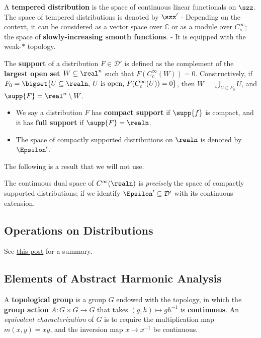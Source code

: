 A \textbf{tempered distribution} is the space of continuous linear
functionals on \(\szz\). The space of tempered distributions is denoted
by \(\szz'\) - Depending on the context, it can be considered as a
vector space over \(\mathbb{C}\) or as a module over \(C_{s}^\infty\);
the space of \textbf{slowly-increasing smooth functions}. - It is
equipped with the weak-\(\ast\) topology.

The \textbf{support} of a distribution \(F\in \mathcal{D}'\) is defined
as the complement of the \textbf{largest open set \(W\subseteq\real^n\)}
such that \(F(C_c^\infty(W))=0\). Constructively, if
\(F_0 = \bigset{U\subseteq\realn,\: U\text{ is open, } F(C_c^\infty(U))=0}\),
then \(W = \bigcup_{U\in F_0}U\), and
\(\supp{F} = \real^{n}\setminus W\).

\begin{itemize}
\tightlist
\item
  We say a distribution \(F\) has \textbf{compact support} if
  \(\supp{f}\) is compact, and it has \textbf{full support} if
  \(\supp{F} = \realn\).
\item
  The space of compactly supported distributions on \(\realn\) is
  denoted by \(\Epsilon'\).
\end{itemize}

The following is a result that we will not use.

The continuous dual space of \(C^\infty(\realn)\) is \emph{precisely}
the space of compactly supported distributions; if we identify
\(\Epsilon'\subseteq\mathcal{D}'\) with its continuous extension.

\hypertarget{operations-on-distributions}{%
\subsection{Operations on
Distributions}\label{operations-on-distributions}}

See
\href{\%7B\%7B\%20site.baseurl\%20\%7D\%7D/\%7B\%\%20post_url\%202023-08-12-folland-distribution-excerpts\%20\%\%7D\#chapter-9---distribution-and-its-operations}{this
post} for a summary.

\hypertarget{elements-of-abstract-harmonic-analysis}{%
\subsection{Elements of Abstract Harmonic
Analysis}\label{elements-of-abstract-harmonic-analysis}}

A \textbf{topological group} is a group \(G\) endowed with the topology,
in which the \textbf{group action} \(A: G\times G\to G\) that takes
\((g,h)\mapsto gh^{-1}\) is \textbf{continuous}. An \emph{equivalent
characterization} of \(G\) is to require the multiplication map
\(m(x,y)= xy\), and the inversion map \(x\mapsto x^{-1}\) be continuous.


